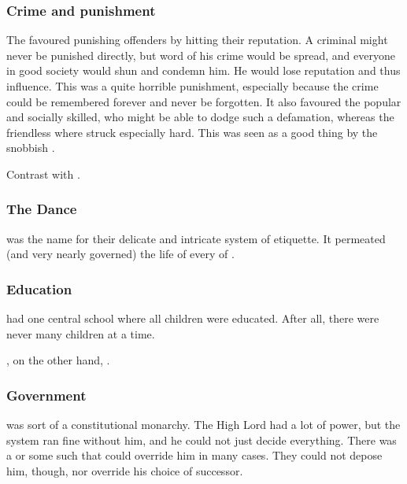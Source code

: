 \subsubsection{Crime and punishment}
The \CiriathSepher favoured punishing offenders by hitting their reputation. 
A criminal might never be punished directly, but word of his crime would be spread, and everyone in good society would shun and condemn him. 
He would lose reputation and thus influence. 
This was a quite horrible punishment, especially because the crime could be remembered forever and never be forgotten. 
It also favoured the popular and socially skilled, who might be able to dodge such a defamation, whereas the friendless where struck especially hard. 
This was seen as a good thing by the snobbish \CiriathSepher. 

Contrast with . 





\subsubsection{The Dance}
 was the \CiriathSepher{} name for their delicate and intricate system of etiquette. 
It permeated (and very nearly governed) the life of every \resphan of \CiriathSepher{}. 





\subsubsection{Education}
\CiriathSepher{} had one central school where all children were educated. 
After all, there were never many children at a time. 

\Mystraacht, on the other hand, . 






\subsubsection{Government}
\CiriathSepher{} was sort of a constitutional monarchy. 
The High Lord had a lot of power, but the system ran fine without him, and he could not just decide everything. 
There was a  or some such that could override him in many cases. 
They could not depose him, though, nor override his choice of successor. 

